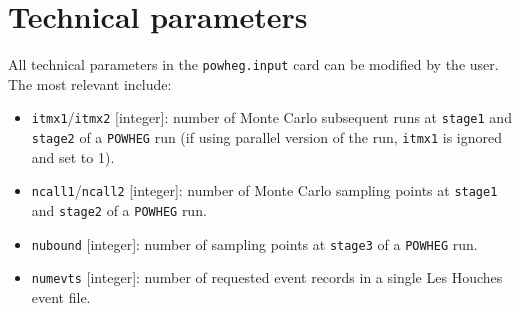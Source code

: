 \documentclass[11pt,a4paper]{article}\pdfoutput=1
\newcommand{\POWHEG}{{\tt{POWHEG}}}
\begin{document}
\section{Technical parameters}
\label{app:tech}
All technical parameters in the \texttt{powheg.input} card can be modified by the user. The most relevant include: 
\begin{itemize}
\item \texttt{itmx1}/\texttt{itmx2} [integer]: number of Monte Carlo
  subsequent runs at \texttt{stage1} and \texttt{stage2} of a
  \POWHEG{} run (if using parallel version of the run, \texttt{itmx1}
  is ignored and set to 1).
\item \texttt{ncall1}/\texttt{ncall2} [integer]: number of Monte Carlo
  sampling points at \texttt{stage1} and \texttt{stage2} of a
  \POWHEG{} run.
\item \texttt{nubound} [integer]: number of sampling points at
  \texttt{stage3} of a \POWHEG{} run.
\item \texttt{numevts} [integer]: number of requested event records in
  a single Les Houches event file.
\end{itemize}
\end{document}
